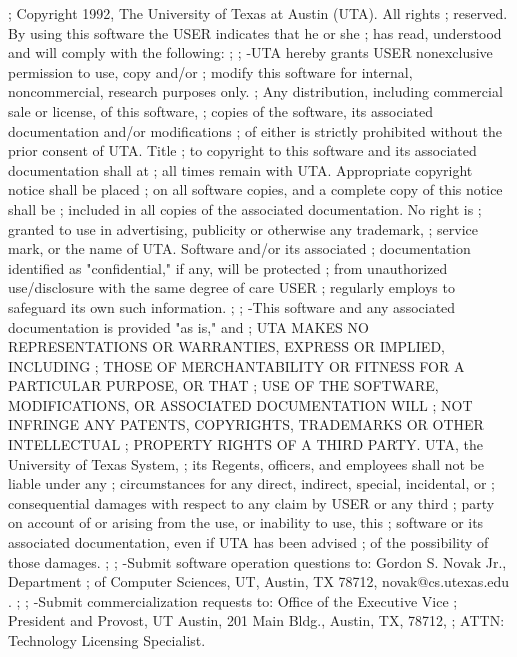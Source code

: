 
; Copyright 1992, The University of Texas at Austin (UTA).  All rights
; reserved.  By using this software the USER indicates that he or she
; has read, understood and will comply with the following:
;
; -UTA hereby grants USER nonexclusive permission to use, copy and/or
; modify this software for internal, noncommercial, research purposes only.
; Any distribution, including commercial sale or license, of this software,
; copies of the software, its associated documentation and/or modifications
; of either is strictly prohibited without the prior consent of UTA.  Title
; to copyright to this software and its associated documentation shall at
; all times remain with UTA.  Appropriate copyright notice shall be placed
; on all software copies, and a complete copy of this notice shall be
; included in all copies of the associated documentation.  No right is
; granted to use in advertising, publicity or otherwise any trademark,
; service mark, or the name of UTA.  Software and/or its associated
; documentation identified as "confidential," if any, will be protected
; from unauthorized use/disclosure with the same degree of care USER
; regularly employs to safeguard its own such information.
;
; -This software and any associated documentation is provided "as is," and
; UTA MAKES NO REPRESENTATIONS OR WARRANTIES, EXPRESS OR IMPLIED, INCLUDING
; THOSE OF MERCHANTABILITY OR FITNESS FOR A PARTICULAR PURPOSE, OR THAT
; USE OF THE SOFTWARE, MODIFICATIONS, OR ASSOCIATED DOCUMENTATION WILL
; NOT INFRINGE ANY PATENTS, COPYRIGHTS, TRADEMARKS OR OTHER INTELLECTUAL
; PROPERTY RIGHTS OF A THIRD PARTY.  UTA, the University of Texas System,
; its Regents, officers, and employees shall not be liable under any
; circumstances for any direct, indirect, special, incidental, or
; consequential damages with respect to any claim by USER or any third
; party on account of or arising from the use, or inability to use, this
; software or its associated documentation, even if UTA has been advised
; of the possibility of those damages.
;
; -Submit software operation questions to: Gordon S. Novak Jr., Department
; of Computer Sciences, UT, Austin, TX 78712, novak@cs.utexas.edu .
;
; -Submit commercialization requests to: Office of the Executive Vice
; President and Provost, UT Austin, 201 Main Bldg., Austin, TX, 78712,
; ATTN: Technology Licensing Specialist.

